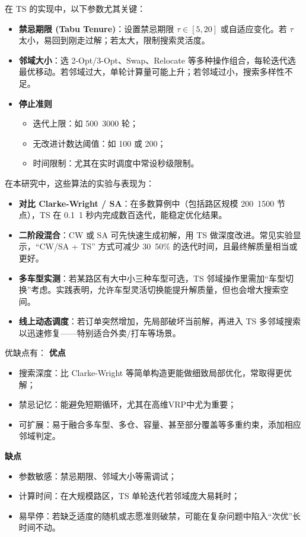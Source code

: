 \documentclass[12pt,a4paper,twoside]{ctexbook}
\begin{document}
在 TS 的实现中，以下参数尤其关键：
\begin{itemize}
    \item \textbf{禁忌期限 (Tabu Tenure)}：设置禁忌期限 $\tau \in [5,20]$ 或自适应变化。若 $\tau$ 太小，易回到刚走过解；若太大，限制搜索灵活度。
    \item \textbf{邻域大小}：选 2-Opt/3-Opt、Swap、Relocate 等多种操作组合，每轮迭代选最优移动。若邻域过大，单轮计算量可能上升；若邻域过小，搜索多样性不足。
    \item \textbf{停止准则}
    \begin{itemize}
        \item 迭代上限：如 500~3000 轮；
        \item 无改进计数达阈值：如 100 或 200；
        \item 时间限制：尤其在实时调度中常设秒级限制。
    \end{itemize}
\end{itemize}

在本研究中，这些算法的实验与表现为：
\begin{itemize}
    \item \textbf{对比 Clarke-Wright / SA}：在多数算例中（包括路区规模 200~1500 节点），TS 在 0.1~1 秒内完成数百迭代，能稳定优化结果。
    \item \textbf{二阶段混合}：CW 或 SA 可先快速生成初解，用 TS 做深度改进。常见实验显示，“CW/SA + TS” 方式可减少 30~50\% 的迭代时间，且最终解质量相当或更好。
    \item \textbf{多车型实测}：若某路区有大中小三种车型可选，TS 邻域操作里需加“车型切换”考虑。实践表明，允许车型灵活切换能提升解质量，但也会增大搜索空间。
    \item \textbf{线上动态调度}：若订单突然增加，先局部破坏当前解，再进入 TS 多邻域搜索以迅速修复——特别适合外卖/打车等场景。
\end{itemize}

优缺点有：
\textbf{优点}
\begin{itemize}
    \item 搜索深度：比 Clarke-Wright 等简单构造更能做细致局部优化，常取得更优解；
    \item 禁忌记忆：能避免短期循环，尤其在高维VRP中尤为重要；
    \item 可扩展：易于融合多车型、多仓、容量、甚至部分覆盖等多重约束，添加相应邻域判定。
\end{itemize}

\textbf{缺点}
\begin{itemize}
    \item 参数敏感：禁忌期限、邻域大小等需调试；
    \item 计算时间：在大规模路区，TS 单轮迭代若邻域庞大易耗时；
    \item 易早停：若缺乏适度的随机或志愿准则破禁，可能在复杂问题中陷入“次优”长时间不动。
\end{itemize}
\end{document}
